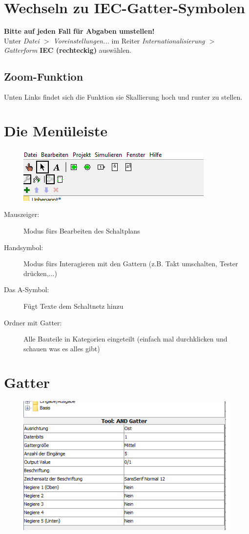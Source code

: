 \documentclass[a4paper]{scrartcl}
\begin{document}
	
\section*{Wechseln zu IEC-Gatter-Symbolen}

\textbf{Bitte auf jeden Fall für Abgaben umstellen!} \\
Unter \textit{Datei $>$ Voreinstellungen...} im Reiter \textit{Internationalisierung $>$ Gatterform} \textbf{IEC (rechteckig)} auswählen. 

\subsection*{Zoom-Funktion}
	Unten Links findet sich die Funktion sie Skallierung hoch und runter zu stellen. 

\section*{Die Menüleiste}
	\begin{figure}[H]
		\centering
		\includegraphics[]{Gatter.png}
	\end{figure}

	\begin{description}
		\item[Mauszeiger:] Modus fürs Bearbeiten des Schaltplans
		\item[Handsymbol:] Modus fürs Interagieren mit den Gattern (z.B. Takt umschalten, Tester drücken,...)
		\item[Das A-Symbol:] Fügt Texte dem Schaltnetz hinzu
		\item[Ordner mit Gatter:] Alle Bauteile in Kategorien eingeteilt (einfach mal durchklicken und schauen was es alles gibt)
	\end{description}

\section*{Gatter}
	\begin{figure}[H]
		\centering
		\includegraphics[height=7cm]{Gatter2.png}
	\end{figure}
	
\end{document}

